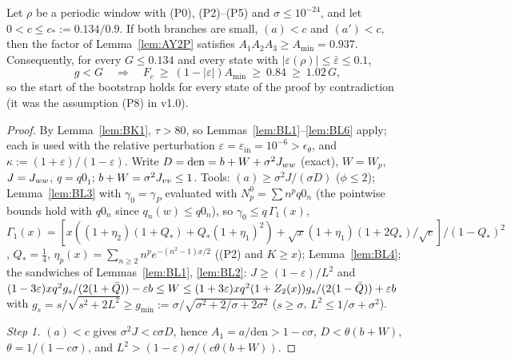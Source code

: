 \begin{lemma} 
\label{lem:BJ1}
Let $\rho$ be a periodic window with (P0), (P2)--(P5) and $\sigma\le10^{-24}$, and let $0<c\le c_*:=0.134/0.9$. If both branches are small,
$(a)<c$ and $(a')<c$, then the factor of Lemma~\ref{lem:AY2P} satisfies $A_1A_2A_3\ge A_{\min}=0.937$. Consequently, for every $G\le0.134$ and every
state with $|\varepsilon(\rho)|\le\bar\varepsilon\le0.1$,
\begin{equation}
g<G\quad\Longrightarrow\quad F_c\ \ge\ (1-|\varepsilon|)A_{\min}\ \ge\ 0.84\ \ge\ 1.02\,G ,
\end{equation}
so the start of the bootstrap holds for every state of the proof by contradiction (it was the assumption (P8) in v1.0).
\end{lemma}
\begin{proof}
By Lemma~\ref{lem:BK1}, $\tau>80$, so Lemmas~\ref{lem:BL1}--\ref{lem:BL6} apply; each is used with the relative perturbation
$\varepsilon=\varepsilon_{\mathrm{in}}=10^{-6}>\epsilon_\theta$, and $\kappa:=(1+\varepsilon)/(1-\varepsilon)$. Write $D=\mathrm{den}=b+W+\sigma^2J_{ww}$ (exact), $W=W_p$,
$J=J_{ww}$, $q=q0_1$; $b+W=\sigma^2J_{vv}\le1$. Tools: $(a)\ge\sigma^2J/(\sigma D)$ ($\phi\le2$); Lemma~\ref{lem:BL3} with
$\gamma_0=\gamma_P$ evaluated with $N_p^0=\sum n^pq0_n$ (the pointwise bounds hold with $q0_n$ since $q_n(w)\le q0_n$), so $\gamma_0\le q\,\Gamma_1(x)$,
$\Gamma_1(x)=[x((1+\eta_2)(1+Q_*)+Q_*(1+\eta_1)^2)+\sqrt x(1+\eta_1)(1+2Q_*)/\sqrt e]/(1-Q_*)^2$, $Q_*=\tfrac14$, $\eta_p(x)=\sum_{n\ge2}n^pe^{-(n^2-1)x/2}$
((P2) and $K\ge x$); Lemma~\ref{lem:BL4}; the sandwiches of Lemmas~\ref{lem:BL1}, \ref{lem:BL2}: $J\ge(1-\varepsilon)/L^2$ and
$(1-3\varepsilon)xq^2g_s/(2(1+\bar Q))-\varepsilon b\le W\le(1+3\varepsilon)xq^2(1+Z_2(x))g_s/(2(1-\bar Q))+\varepsilon b$ with $g_s=s/\sqrt{s^2+2L^2}\ge g_{\min}:=
\sigma/\sqrt{\sigma^2+2/\sigma+2\sigma^2}$ ($s\ge\sigma$, $L^2\le1/\sigma+\sigma^2$).

\emph{Step 1.} $(a)<c$ gives $\sigma^2J<c\sigma D$, hence $A_1=a/\mathrm{den}>1-c\sigma$, $D<\theta(b+W)$, $\theta=1/(1-c\sigma)$, and $L^2>(1-\varepsilon)\sigma/(c\theta(b+W))$.


\end{proof}
